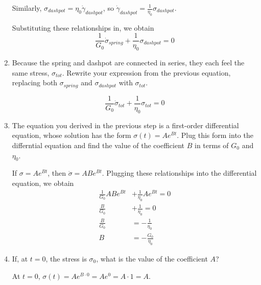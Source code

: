\begin{activity}
\begin{exercises}
\begin{enumerate}
\begin{solution}
						Similarly, $\sigma_{dashpot} = \eta_0 \dot\gamma_{dashpot}$, so $\dot\gamma_{dashpot} = \frac{1}{\eta_0}\sigma_{dashpot}$.
						
						Substituting these relationships in, we obtain
						\begin{equation*}
							\frac{1}{G_0}\dot\sigma_{spring} + \frac{1}{\eta_0}\sigma_{dashpot} = 0
						\end{equation*}
					\end{solution}
					
				\item Because the spring and dashpot are connected in series, they each feel the same stress, $\sigma_{tot}$.  Rewrite your expression from the previous equation, replacing both $\sigma_{spring}$ and $\sigma_{dashpot}$ with $\sigma_{tot}$.
				
					\begin{solution}
						\begin{equation*}
							\frac{1}{G_0}\dot\sigma_{tot} + \frac{1}{\eta_0}\sigma_{tot} = 0
						\end{equation*}
					\end{solution}			
				
				
				\item The equation you derived in the previous step is a first-order differential equation, whose solution has the form $\sigma(t) = A e^{Bt}$.  Plug this form into the differntial equation and find the value of the coefficient $B$ in terms of $G_0$ and $\eta_0$.
				
					\begin{solution}
						If $\sigma = A e^{Bt}$, then $\dot\sigma = ABe^{Bt}$.  Plugging these relationships into the differential equation, we obtain
						\begin{align*}
							\frac{1}{G_0}ABe^{Bt} &+ \frac{1}{\eta_0}Ae^{Bt} = 0\\
							\frac{B}{G_0} &+ \frac{1}{\eta_0} = 0\\
							\frac{B}{G_0} &= -\frac{1}{\eta_0} \\
							B &= -\frac{G_0}{\eta_0}
						\end{align*}
					\end{solution} 
					
				\item If, at $t=0$, the stress is $\sigma_0$, what is the value of the coefficient $A$?
				
					\begin{solution}
						At $t=0$, $\sigma(t) = A e^{B \cdot 0} = A e^{0} = A \cdot 1 = A$.
						

\end{solution}
\end{enumerate}
\end{exercises}
\end{activity}
